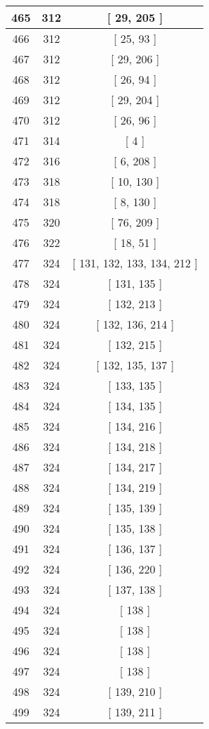 \begin{center}
\begin{longtable}[H]{|| c c c ||}
\hline
465 & 312 & [ 29, 205 ] \\ 
\hline
466 & 312 & [ 25, 93 ] \\ 
\hline
467 & 312 & [ 29, 206 ] \\ 
\hline
468 & 312 & [ 26, 94 ] \\ 
\hline
469 & 312 & [ 29, 204 ] \\ 
\hline
470 & 312 & [ 26, 96 ] \\ 
\hline
471 & 314 & [ 4 ] \\ 
\hline
472 & 316 & [ 6, 208 ] \\ 
\hline
473 & 318 & [ 10, 130 ] \\ 
\hline
474 & 318 & [ 8, 130 ] \\ 
\hline
475 & 320 & [ 76, 209 ] \\ 
\hline
476 & 322 & [ 18, 51 ] \\ 
\hline
477 & 324 & [ 131, 132, 133, 134, 212 ] \\ 
\hline
478 & 324 & [ 131, 135 ] \\ 
\hline
479 & 324 & [ 132, 213 ] \\ 
\hline
480 & 324 & [ 132, 136, 214 ] \\ 
\hline
481 & 324 & [ 132, 215 ] \\ 
\hline
482 & 324 & [ 132, 135, 137 ] \\ 
\hline
483 & 324 & [ 133, 135 ] \\ 
\hline
484 & 324 & [ 134, 135 ] \\ 
\hline
485 & 324 & [ 134, 216 ] \\ 
\hline
486 & 324 & [ 134, 218 ] \\ 
\hline
487 & 324 & [ 134, 217 ] \\ 
\hline
488 & 324 & [ 134, 219 ] \\ 
\hline
489 & 324 & [ 135, 139 ] \\ 
\hline
490 & 324 & [ 135, 138 ] \\ 
\hline
491 & 324 & [ 136, 137 ] \\ 
\hline
492 & 324 & [ 136, 220 ] \\ 
\hline
493 & 324 & [ 137, 138 ] \\ 
\hline
494 & 324 & [ 138 ] \\ 
\hline
495 & 324 & [ 138 ] \\ 
\hline
496 & 324 & [ 138 ] \\ 
\hline
497 & 324 & [ 138 ] \\ 
\hline
498 & 324 & [ 139, 210 ] \\ 
\hline
499 & 324 & [ 139, 211 ] \\ 

\end{longtable}
\end{center}
